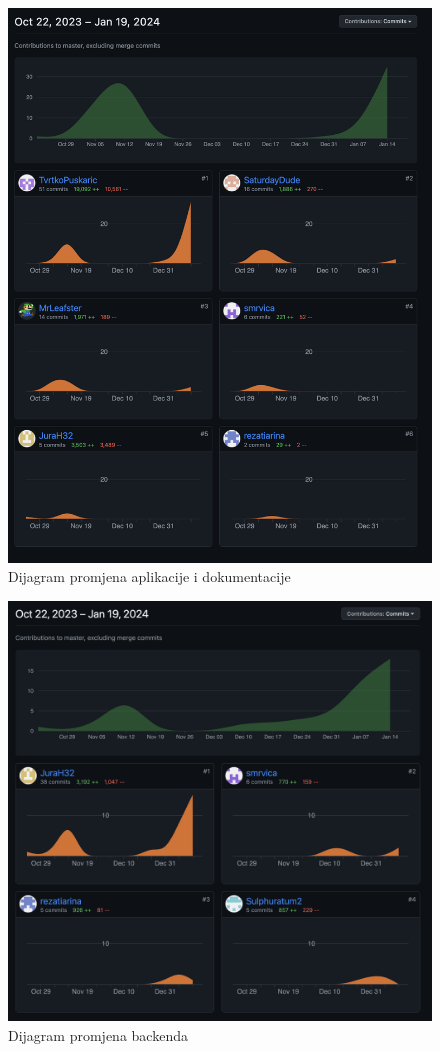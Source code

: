 		\begin{figure}[H]
			\includegraphics[width=\textwidth]{slike/dijagramPromjenaApp.png}
			\caption{Dijagram promjena aplikacije i dokumentacije}
			\label{fig:dijagramPromjenaApp}
		\end{figure}
		
		\begin{figure}[H]
			\includegraphics[width=\textwidth]{slike/dijagramPromjenaAPI.png}
			\caption{Dijagram promjena backenda}
			\label{fig:dijagramPromjenaAPI}
		\end{figure}
		
	